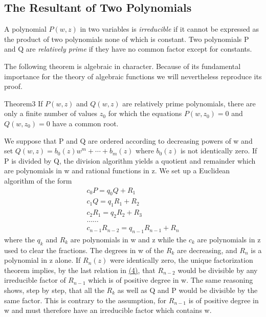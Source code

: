 \setcounter{section}{2}\setcounter{subsection}{0}\subsection{The Resultant of Two Polynomials}\label{sec:8.2.1}
A polynomial $P(w,z)$ in two variables is \emph{irreducible} if it cannot be expressed as the product of two polynomials none of which is constant. Two polynomials P and Q are \emph{relatively prime} if they have no common factor except for constants.

The following theorem is algebraic in character. Because of its fundamental importance for the theory of algebraic functions we will nevertheless reproduce its proof.

\begin{originalstatement}{Theorem}{3}\label{thm:8.3}
If $P(w,z)$ and $Q(w,z)$ are relatively prime polynomials, there are only a finite number of values $z_0$ for which the equations $P(w,z_0) = 0$ and $Q(w,z_0) = 0$ have a common root.
\end{originalstatement}

We suppose that P and Q are ordered according to decreasing powers of w and set $Q(w,z) = b_{0}(z)w^{m} + \cdots + b_{m}(z)$ where $b_{0}(z)$ is not identically zero. If P is divided by Q, the division algorithm yields a quotient and remainder which are polynomials in w and rational functions in z. We set up a Euclidean algorithm of the form
\begin{equation*}
\begin{array}{l} c _ {0} P = q _ {0} Q + R _ {1} \\ c _ {1} Q = q _ {1} R _ {1} + R _ {2} \\ c _ {2} R _ {1} = q _ {2} R _ {2} + R _ {3} \\ \dots \dots \\ c _ {n - 1} R _ {n - 2} = q _ {n - 1} R _ {n - 1} + R _ {n} \end{array}\tag{4}\label{eq:8.4}
\end{equation*}
where the $q_{k}$ and $R_{k}$ are polynomials in w and z while the $c_{k}$ are polynomials in z used to clear the fractions. The degrees in w of the $R_{k}$ are decreasing, and $R_{n}$ is a polynomial in z alone. If $R_{n}(z)$ were identically zero, the unique factorization theorem implies, by the last relation in \hyperref[eq:8.4]{(4)}, that $R_{n-2}$ would be divisible by any irreducible factor of $R_{n-1}$ which is of positive degree in w. The same reasoning shows, step by step, that all the $R_{k}$ as well as Q and P would be divisible by the same factor. This is contrary to the assumption, for $R_{n-1}$ is of positive degree in w and must therefore have an irreducible factor which contains w.

